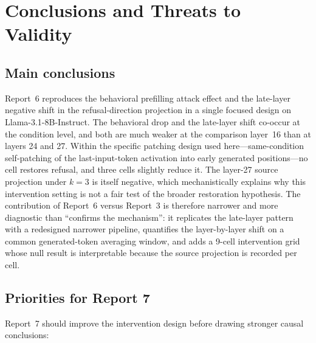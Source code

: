 \documentclass{article}
\begin{document}
\section{Conclusions and Threats to Validity}
\label{sec:conclusions}

\subsection{Main conclusions}

Report~6 reproduces the behavioral prefilling attack effect and the
late-layer negative shift in the refusal-direction projection in a single
focused design on Llama-3.1-8B-Instruct. The behavioral drop and the
late-layer shift co-occur at the condition level, and both are much weaker
at the comparison layer~16 than at layers 24 and 27. Within the specific
patching design used here---same-condition self-patching of the
last-input-token activation into early generated positions---no cell
restores refusal, and three cells slightly reduce it. The layer-27 source
projection under $k=3$ is itself negative, which mechanistically explains
why this intervention setting is not a fair test of the broader
restoration hypothesis. The contribution of Report~6 versus Report~3 is
therefore narrower and more diagnostic than ``confirms the mechanism'':
it replicates the late-layer pattern with a redesigned narrower pipeline,
quantifies the layer-by-layer shift on a common generated-token averaging
window, and adds a 9-cell intervention grid whose null result is
interpretable because the source projection is recorded per cell.

\subsection{Priorities for Report 7}

Report~7 should improve the intervention design before drawing stronger
causal conclusions:
\end{document}
